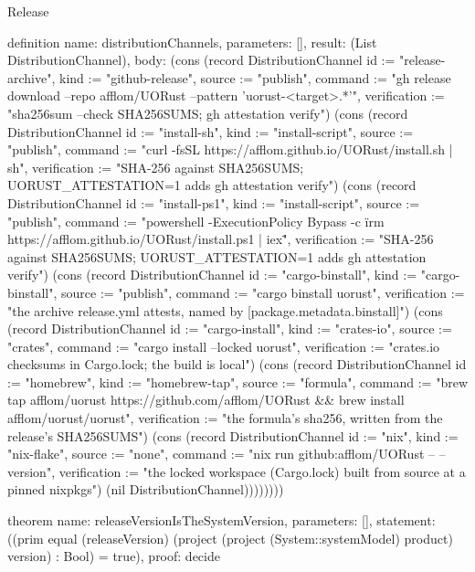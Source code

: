 \begin{lexlean}{Release}
\begin{semanticmodule}
definition{
  name: distributionChannels,
  parameters: [],
  result: (List DistributionChannel),
  body: (cons (record DistributionChannel {id := "release-archive", kind := "github-release", source := "publish", command := "gh release download --repo afflom/UORust --pattern 'uorust-<target>.*'", verification := "sha256sum --check SHA256SUMS; gh attestation verify"}) (cons (record DistributionChannel {id := "install-sh", kind := "install-script", source := "publish", command := "curl -fsSL https://afflom.github.io/UORust/install.sh | sh", verification := "SHA-256 against SHA256SUMS; UORUST_ATTESTATION=1 adds gh attestation verify"}) (cons (record DistributionChannel {id := "install-ps1", kind := "install-script", source := "publish", command := "powershell -ExecutionPolicy Bypass -c \"irm https://afflom.github.io/UORust/install.ps1 | iex\"", verification := "SHA-256 against SHA256SUMS; UORUST_ATTESTATION=1 adds gh attestation verify"}) (cons (record DistributionChannel {id := "cargo-binstall", kind := "cargo-binstall", source := "publish", command := "cargo binstall uorust", verification := "the archive release.yml attests, named by [package.metadata.binstall]"}) (cons (record DistributionChannel {id := "cargo-install", kind := "crates-io", source := "crates", command := "cargo install --locked uorust", verification := "crates.io checksums in Cargo.lock; the build is local"}) (cons (record DistributionChannel {id := "homebrew", kind := "homebrew-tap", source := "formula", command := "brew tap afflom/uorust https://github.com/afflom/UORust && brew install afflom/uorust/uorust", verification := "the formula's sha256, written from the release's SHA256SUMS"}) (cons (record DistributionChannel {id := "nix", kind := "nix-flake", source := "none", command := "nix run github:afflom/UORust -- --version", verification := "the locked workspace (Cargo.lock) built from source at a pinned nixpkgs"}) (nil DistributionChannel))))))))
}

theorem{
  name: releaseVersionIsTheSystemVersion,
  parameters: [],
  statement: ((prim equal (releaseVersion) (project (project (System::systemModel) product) version) : Bool) = true),
  proof: decide{}
}


\end{semanticmodule}
\end{lexlean}
